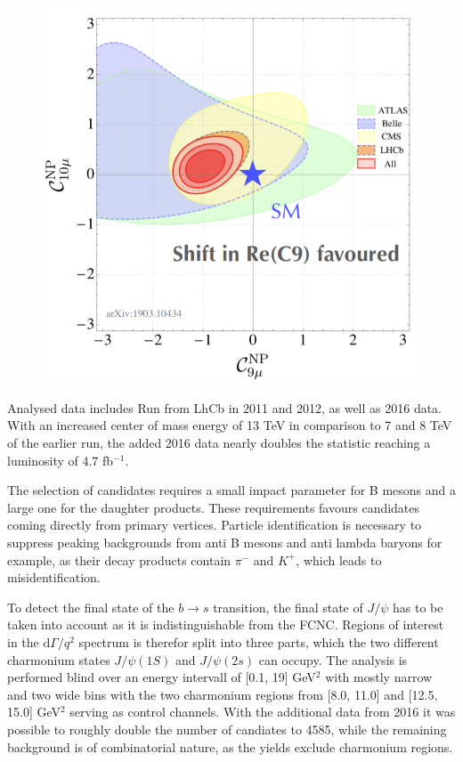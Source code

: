 \documentclass[%
 reprint,
 amsmath,amssymb,
 aps,
]{revtex4-2}
\begin{document}
\begin{figure}[b]
\includegraphics{shift}
\caption{\label{fig:shift}}
\end{figure}


Analysed data includes Run from LhCb in 2011 and 2012, as well as 2016 data. With an increased center of mass energy of 13 TeV in
comparison to 7 and 8 TeV of the earlier run, the added 2016 data nearly doubles the statistic reaching a
luminosity of 4.7 fb$^{-1}$.

The selection of candidates requires a small impact parameter for B mesons and a large one for the daughter products. These
requirements favours candidates coming directly from primary vertices. Particle identification is necessary to suppress peaking
backgrounds from anti B mesons and anti lambda baryons for example, as their decay products contain $\pi^-$ and $K^+$, which
leads to misidentification.

To detect the final state of the $b \longrightarrow s$ transition, the final state of $J/\psi$ has to be taken into account as
it is indistinguishable from the FCNC. Regions of interest in the $\text{d}\Gamma/q^2$ spectrum is therefor split
into three parts, which the two different charmonium states $J/\psi(1S)$ and $J/\psi(2s)$ can occupy.
The analysis is performed blind over an energy intervall of [0.1, 19] GeV$^2$ with mostly narrow and two wide bins with
the two charmonium regions from [8.0, 11.0] and [12.5, 15.0] GeV$^2$ serving as control channels.
With the additional data from 2016 it was possible to roughly double the number of candiates to 4585, while the
remaining background is of combinatorial nature, as the yields exclude charmonium regions.
\end{document}
